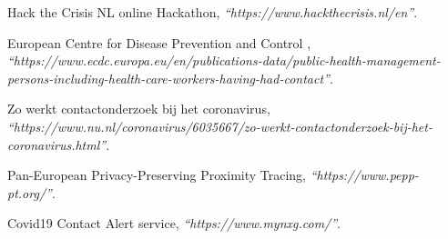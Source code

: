 \documentclass[a4paper, 12pt]{article}
\numberwithin{equation}{section}
\begin{document}












\begin{thebibliography}{11}

	 Hack the Crisis NL online Hackathon, \emph{``https://www.hackthecrisis.nl/en''}.
	
	 European Centre for Disease Prevention and Control , \emph{``https://www.ecdc.europa.eu/en/publications-data/public-health-management-persons-including-health-care-workers-having-had-contact''}.
	
	 Zo werkt contactonderzoek bij het coronavirus, \emph{``https://www.nu.nl/coronavirus/6035667/zo-werkt-contactonderzoek-bij-het-coronavirus.html''}.
	
	
	 Pan-European Privacy-Preserving Proximity Tracing, \emph{``https://www.pepp-pt.org/''}.
	
	 Covid19 Contact Alert service, \emph{``https://www.mynxg.com/''}.
		
		
\end{thebibliography}
\end{document}
